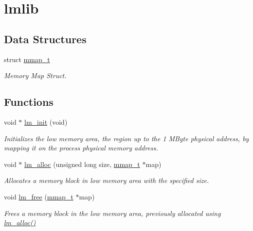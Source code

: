 \hypertarget{group__lmlib}{}\section{lmlib}
\label{group__lmlib}
\subsection*{Data Structures}
\begin{DoxyCompactItemize}
\item 
struct \hyperlink{structmmap__t}{mmap\+\_\+t}
\begin{DoxyCompactList}\small\item\em Memory Map Struct. \end{DoxyCompactList}\end{DoxyCompactItemize}
\subsection*{Functions}
\begin{DoxyCompactItemize}
\item 
void $\ast$ \hyperlink{group__lmlib_ga00a9c17c01e794a6bfc80fc5c6ab1ed1}{lm\+\_\+init} (void)
\begin{DoxyCompactList}\small\item\em Initializes the low memory area, the region up to the 1 M\+Byte physical address, by mapping it on the process\textquotesingle{} physical memory address. \end{DoxyCompactList}\item 
void $\ast$ \hyperlink{group__lmlib_gae45d971ce2ffcf4dc2677eba033a92cd}{lm\+\_\+alloc} (unsigned long size, \hyperlink{structmmap__t}{mmap\+\_\+t} $\ast$map)
\begin{DoxyCompactList}\small\item\em Allocates a memory block in low memory area with the specified size. \end{DoxyCompactList}\item 
void \hyperlink{group__lmlib_ga73e89d9c297b7390021fb545513579c6}{lm\+\_\+free} (\hyperlink{structmmap__t}{mmap\+\_\+t} $\ast$map)
\begin{DoxyCompactList}\small\item\em Frees a memory block in the low memory area, previously allocated using \hyperlink{group__lmlib_gae45d971ce2ffcf4dc2677eba033a92cd}{lm\+\_\+alloc()} \end{DoxyCompactList}\end{DoxyCompactItemize}
